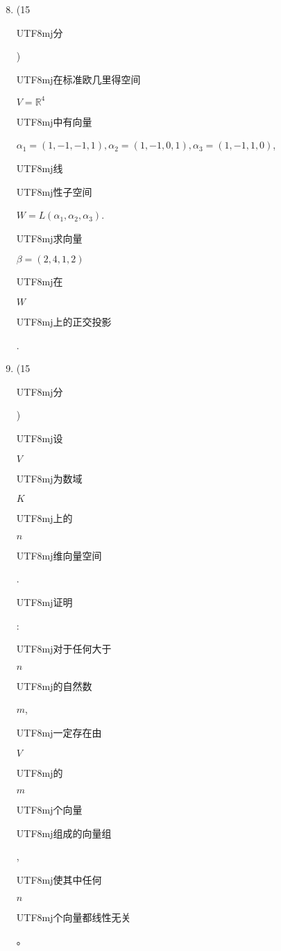 \documentclass[10pt]{article}
\begin{document}
\begin{enumerate}
  \setcounter{enumi}{7}
  \item (15 \begin{CJK}{UTF8}{mj}分\end{CJK}) \begin{CJK}{UTF8}{mj}在标准欧几里得空间\end{CJK} $V=\mathbb{R}^{4}$ \begin{CJK}{UTF8}{mj}中有向量\end{CJK} $\alpha_{1}=(1,-1,-1,1), \alpha_{2}=(1,-1,0,1), \alpha_{3}=(1,-1,1,0)$, \begin{CJK}{UTF8}{mj}线\end{CJK} \begin{CJK}{UTF8}{mj}性子空间\end{CJK} $W=L\left(\alpha_{1}, \alpha_{2}, \alpha_{3}\right)$. \begin{CJK}{UTF8}{mj}求向量\end{CJK} $\beta=(2,4,1,2)$ \begin{CJK}{UTF8}{mj}在\end{CJK} $W$ \begin{CJK}{UTF8}{mj}上的正交投影\end{CJK}.

  \item (15 \begin{CJK}{UTF8}{mj}分\end{CJK}) \begin{CJK}{UTF8}{mj}设\end{CJK} $V$ \begin{CJK}{UTF8}{mj}为数域\end{CJK} $K$ \begin{CJK}{UTF8}{mj}上的\end{CJK} $n$ \begin{CJK}{UTF8}{mj}维向量空间\end{CJK}. \begin{CJK}{UTF8}{mj}证明\end{CJK}: \begin{CJK}{UTF8}{mj}对于任何大于\end{CJK} $n$ \begin{CJK}{UTF8}{mj}的自然数\end{CJK} $m$,\begin{CJK}{UTF8}{mj}一定存在由\end{CJK} $V$ \begin{CJK}{UTF8}{mj}的\end{CJK} $m$ \begin{CJK}{UTF8}{mj}个向量\end{CJK} \begin{CJK}{UTF8}{mj}组成的向量组\end{CJK}, \begin{CJK}{UTF8}{mj}使其中任何\end{CJK} $n$ \begin{CJK}{UTF8}{mj}个向量都线性无关\end{CJK}。

\end{enumerate}
\end{document}
